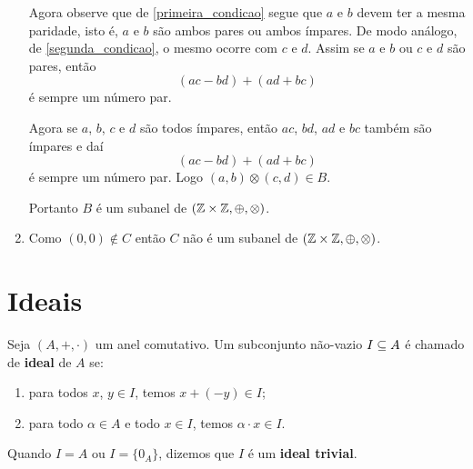 \begin{exemplo}
\begin{solucao}
\begin{enumerate}[label={\alph*})]
                Agora observe que de \eqref{primeira_condicao} segue que $a$ e $b$ devem ter a mesma paridade, isto é, $a$ e $b$ são
                ambos pares ou ambos ímpares. De modo análogo, de \eqref{segunda_condicao}, o mesmo ocorre com $c$ e $d$. Assim se $a$ e $b$ ou $c$ e $d$ são pares, então
                \[
                    (ac - bd) + (ad + bc)
                \]
                é sempre um número par.

                Agora se $a$, $b$, $c$ e $d$ são todos ímpares, então $ac$, $bd$, $ad$ e $bc$ também são ímpares e daí
                \[
                    (ac - bd) + (ad + bc)
                \]
                é sempre um número par. Logo $(a, b) \otimes (c, d) \in B$.

                Portanto $B$ é um subanel de $(\mathbb{Z} \times \mathbb{Z}, \oplus, \otimes)$.

            \item Como $(0, 0) \notin C$ então $C$ não é um subanel de $(\mathbb{Z} \times \mathbb{Z}, \oplus, \otimes)$.
        \end{enumerate}
    \end{solucao}
\end{exemplo}

\newpage

\section{Ideais} %
\label{sec:ideais}

\begin{definicao}
    Seja $(A, +, \cdot)$ um anel comutativo. Um subconjunto n\~ao-vazio $I \subseteq A$ {\'e} chamado de \textbf{ideal} de $A$ se:
    \begin{enumerate}[label={\roman*})]
        \item para todos $x$, $y \in I$, temos $x + (-y) \in I$;
        \item para todo $\alpha \in A$ e todo $x \in I$, temos $\alpha\cdot x \in I$.
    \end{enumerate}
\end{definicao}

\begin{observacao}
    Quando $I = A$ ou $I = \{0_A\}$, dizemos que $I$ {\'e} um \textbf{ideal trivial}.
\end{observacao}

